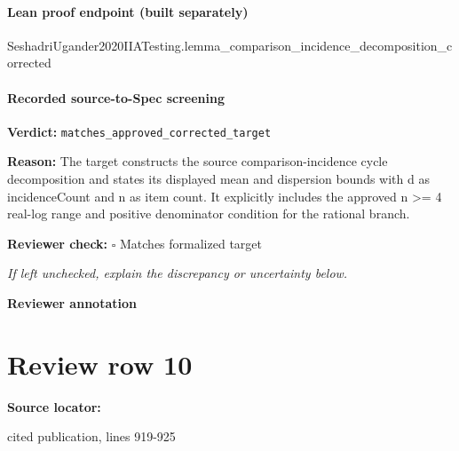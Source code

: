 \documentclass[10pt]{article}
\newcommand{\reviewerbox}{%
  \par\noindent\fbox{\parbox{0.96\linewidth}{\rule{0pt}{0.38in}}}\par
}
\newcommand{\reviewmatch}[1]{%
  \par\noindent\textbf{Reviewer check:} $\square$\; #1\par
  \noindent\emph{If left unchecked, explain the discrepancy or uncertainty below.}\par
}
\begin{document}
\paragraph{Lean proof endpoint (built separately)}\begin{ReviewVerbatim}
SeshadriUgander2020IIATesting.lemma_comparison_incidence_decomposition_corrected
\end{ReviewVerbatim}

\paragraph{Recorded source-to-Spec screening}
\textbf{Verdict:} \texttt{matches\_approved\_corrected\_target}
\\
{\raggedright
\textbf{Reason:} The target constructs the source comparison-\allowbreak{}incidence cycle decomposition and states its displayed mean and dispersion bounds with d as incidenceCount and n as item count.\allowbreak{} It explicitly includes the approved n >= 4 real-\allowbreak{}log range and positive denominator condition for the rational branch.\allowbreak{}
\par}
\reviewmatch{Matches formalized target}
\noindent\textbf{Reviewer annotation}\par
\reviewerbox
\clearpage
\hypertarget{source-claim-8bbf68e52109432f}{}
\section*{Review row 10}
\textbf{Source locator:} {\footnotesize\raggedright cited publication, lines 919-\allowbreak{}925\par}
\end{document}
